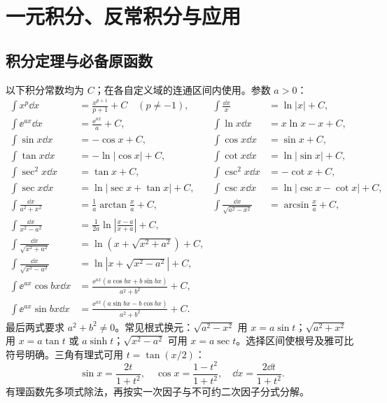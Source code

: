 \chapter{一元积分、反常积分与应用}
\section{积分定理与必备原函数}
以下积分常数均为 $C$；在各自定义域的连通区间内使用。参数 $a>0$：
\begin{align*}
\int x^p\dd x&=\frac{x^{p+1}}{p+1}+C\quad(p\ne-1),&\int\frac{\dd x}x&=\ln|x|+C,\\
\int\ee^{ax}\dd x&=\frac{\ee^{ax}}a+C,&\int\ln x\dd x&=x\ln x-x+C,\\
\int\sin x\dd x&=-\cos x+C,&\int\cos x\dd x&=\sin x+C,\\
\int\tan x\dd x&=-\ln|\cos x|+C,&\int\cot x\dd x&=\ln|\sin x|+C,\\
\int\sec^2x\dd x&=\tan x+C,&\int\csc^2x\dd x&=-\cot x+C,\\
\int\sec x\dd x&=\ln|\sec x+\tan x|+C,&\int\csc x\dd x&=\ln|\csc x-\cot x|+C,\\
\int\frac{\dd x}{a^2+x^2}&=\frac1a\arctan\frac xa+C,&
\int\frac{\dd x}{\sqrt{a^2-x^2}}&=\arcsin\frac xa+C,\\
\int\frac{\dd x}{x^2-a^2}&=\frac1{2a}\ln\left|\frac{x-a}{x+a}\right|+C,\\
\int\frac{\dd x}{\sqrt{x^2+a^2}}&=\ln(x+\sqrt{x^2+a^2})+C,\\
\int\frac{\dd x}{\sqrt{x^2-a^2}}&=\ln|x+\sqrt{x^2-a^2}|+C,\\
\int\ee^{ax}\cos bx\dd x&=\frac{\ee^{ax}(a\cos bx+b\sin bx)}{a^2+b^2}+C,\\
\int\ee^{ax}\sin bx\dd x&=\frac{\ee^{ax}(a\sin bx-b\cos bx)}{a^2+b^2}+C.
\end{align*}
最后两式要求 $a^2+b^2\ne0$。常见根式换元：$\sqrt{a^2-x^2}$ 用 $x=a\sin t$；$\sqrt{a^2+x^2}$ 用 $x=a\tan t$ 或 $a\sinh t$；$\sqrt{x^2-a^2}$ 可用 $x=a\sec t$。选择区间使根号及雅可比符号明确。三角有理式可用 $t=\tan(x/2)$：
\[\sin x=\frac{2t}{1+t^2},\quad\cos x=\frac{1-t^2}{1+t^2},\quad\dd x=\frac{2\dd t}{1+t^2}.\]
有理函数先多项式除法，再按实一次因子与不可约二次因子分式分解。


